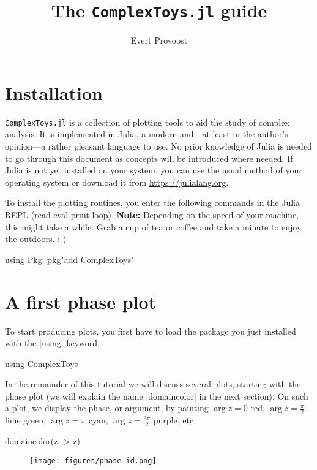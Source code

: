 \documentclass[a4paper]{article}
\title{\vspace*{-1em}The \texttt{ComplexToys.jl} guide}
\author{Evert Provoost}
\date{}
\begin{document}
\maketitle

\section{Installation}

\texttt{ComplexToys.jl} is a collection of
plotting tools to aid the study of complex analysis. It is implemented in Julia,
a modern and---at least in the author's opinion---a rather pleasant language to
use.  No prior knowledge of Julia is needed to go through this document as
concepts will be introduced where needed. If Julia is not yet installed on your
system, you can use the usual method of your operating system or download it
from \url{https://julialang.org}.

To install the plotting routines, you enter the following commands in the Julia
REPL (read eval print loop).  \textbf{Note:} Depending on the speed of your
machine, this might take a while. Grab a cup of tea or coffee and take a minute
to enjoy the outdoors. :-)

\begin{juliaverbatim}
	using Pkg; pkg"add ComplexToys"
\end{juliaverbatim}

\section{A first phase plot}

To start producing plots, you first have to load the package you just installed
with the \jlv|using| keyword.

\begin{juliaverbatim}
	using ComplexToys
\end{juliaverbatim}

In the remainder of this tutorial we will discuss several plots, starting with
the phase plot (we will explain the name \jlv|domaincolor| in the next
section). On such a plot, we display the phase, or argument, by painting
$\arg z = 0$ red, $\arg z = \frac{\pi}{2}$ lime green, $\arg z = \pi$ cyan,
$\arg z = \frac{3\pi}{2}$ purple, etc.

\begin{juliaverbatim}
	domaincolor(z -> z)
\end{juliaverbatim}
\begin{figure}[H]
	\centering
	\texttt{[image: figures/phase-id.png]}
\end{figure}
\end{document}
